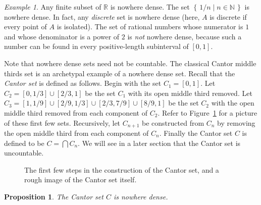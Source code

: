 \documentclass[11pt,oneside,a4paper]{amsbook}
\newcommand{\set}[1]{\left\{\,#1\,\right\}}
\newcommand{\N}{\mathbb N}
\newcommand{\R}{\mathbb R}
\theoremstyle{definition}
\theoremstyle{plain}
\newtheorem{proposition}[theorem]{Proposition}
\theoremstyle{definition}
\theoremstyle{remark}
\newtheorem{example}[theorem]{Example}
\numberwithin{equation}{section}
\numberwithin{figure}{section}
\begin{document}
\begin{example}
  Any finite subset of $\R$ is nowhere dense. The set $\set{1/n\mid n\in\N}$ is nowhere dense. In fact, any \emph{discrete} set is nowhere dense (here, $A$ is discrete if every point of $A$ is isolated). The set of rational numbers whose numerator is $1$ and whose denominator is a power of $2$ is \emph{not} nowhere dense, because such a number can be found in every positive-length subinterval of $[0,1]$.
\end{example}

Note that nowhere dense sets need not be countable. The classical Cantor middle thirds set is an archetypal example of a nowhere dense set. Recall that the \emph{Cantor set} is defined as follows. Begin with the set $C_1=[0,1]$. Let $C_2=[0,1/3]\cup[2/3,1]$ be the set $C_1$ with its open middle third removed. Let $C_3=[1,1/9]\cup[2/9,1/3]\cup[2/3,7/9]\cup[8/9,1]$ be the set $C_2$ with the open middle third removed from each component of $C_2$. Refer to Figure~\ref{fig:cantor-set} for a picture of these first few sets. Recursively, let $C_{n+1}$ be constructed from $C_n$ by removing the open middle third from each component of $C_n$. Finally the Cantor set $C$ is defined to be $C=\bigcap C_n$. We will see in a later section that the Cantor set is uncountable. %

\begin{figure}[h]
\begin{center}
\end{center}
\caption{The first few steps in the construction of the Cantor set, and a rough image of the Cantor set itself.\label{fig:cantor-set}}
\end{figure}

\begin{proposition}
  The Cantor set $C$ is nowhere dense.
\end{proposition}
\end{document}
